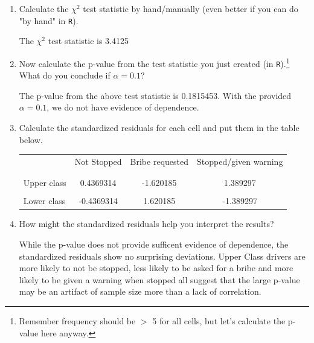 \documentclass[12pt,letterpaper]{article}
\begin{document}
\begin{enumerate}
	
	\item [(a)]
	Calculate the $\chi^2$ test statistic by hand/manually (even better if you can do "by hand" in \texttt{R}).\\
	\vspace{.5cm}
	
	  
	  
	
	The $\chi^2$ test statistic is 3.4125
	\vspace*{.5cm}
	
	\item [(b)]
	Now calculate the p-value from the test statistic you just created (in \texttt{R}).\footnote{Remember frequency should be $>$ 5 for all cells, but let's calculate the p-value here anyway.}  What do you conclude if $\alpha = 0.1$?\\
	\vspace{.5cm}
	
		 
		
		The p-value from the above test statistic is 0.1815453.  With the provided $\alpha =0.1$,  we do not have evidence of dependence.
	
	
	\newpage
	\item [(c)] Calculate the standardized residuals for each cell and put them in the table below.
	\vspace{.5cm}

	 
	\vspace{.5cm}
	
	\begin{table}[H]
		\centering
		\begin{tabular}{l | c c c }
			& Not Stopped & Bribe requested & Stopped/given warning \\
			\\[-1.8ex] 
			\hline \\[-1.8ex]
			Upper class  & 0.4369314 & -1.620185 &1.389297\\
			\\
			Lower class &  -0.4369314 &  1.620185 & -1.389297  \\
			
		\end{tabular}
	\end{table}
	
	
	\vspace{.5cm}
	\item [(d)] How might the standardized residuals help you interpret the results?  
	
	While the p-value does not provide sufficent evidence of dependence, the standardized residuals show no surprising deviations.  Upper Class drivers are more likely to not be stopped, less likely to be asked for a bribe and more likely to be given a warning when stopped all suggest that the large p-value may be an artifact of sample size more than a lack of correlation.
	
\end{enumerate}
\end{document}
